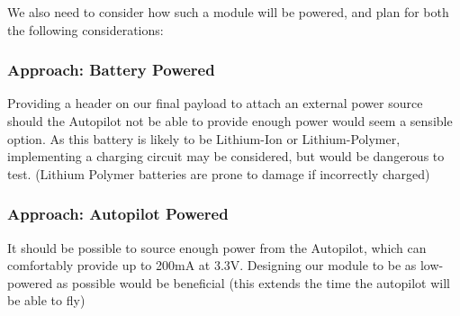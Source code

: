 We also need to consider how such a module will be powered, and plan for both the following considerations:

\subsubsection{Approach: Battery Powered}

Providing a header on our final payload to attach an external power source 
should the Autopilot not be able to provide enough power would seem a 
sensible option. As this battery is likely to be Lithium-Ion or 
Lithium-Polymer, implementing a charging circuit may be considered, but would 
be dangerous to test. (Lithium Polymer batteries are prone to damage if incorrectly charged)

\subsubsection{Approach: Autopilot Powered}

It should be possible to source enough power from the Autopilot, which can 
comfortably provide up to 200mA at 3.3V. Designing our module to be as low-powered 
as possible would be beneficial (this extends the time the autopilot will be 
able to fly)


